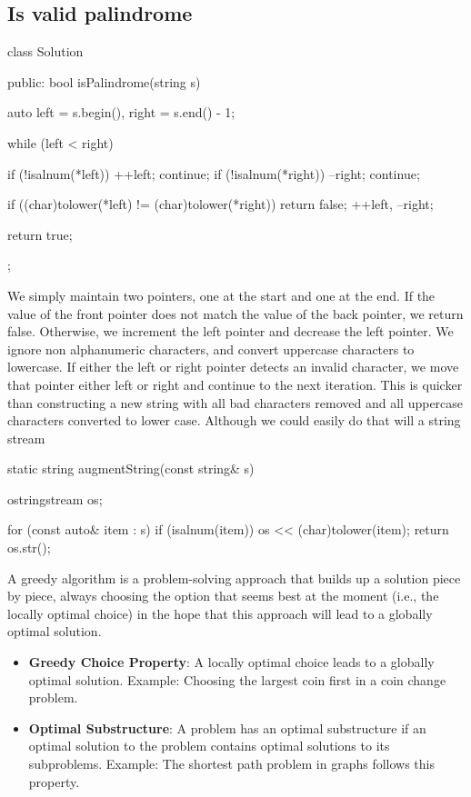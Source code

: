 \documentclass{report}
\begin{document}
\pagebreak 
\subsection{Is valid palindrome}
\bigbreak \noindent 
\begin{cppcode}
    class Solution {
        public:
        bool isPalindrome(string s) {
            auto left = s.begin(), right = s.end() - 1;

            while (left < right) {
                if (!isalnum(*left)) { ++left; continue; }
                if (!isalnum(*right)) { --right; continue; }

                if ((char)tolower(*left) != (char)tolower(*right)) return false;
                ++left, --right;
            }
            return true;
        }
    };
\end{cppcode}
\bigbreak \noindent 
We simply maintain two pointers, one at the start and one at the end. If the value of the front pointer does not match the value of the back pointer, we return false. Otherwise, we increment the left pointer and decrease the left pointer.
\bigbreak \noindent 
We ignore non alphanumeric characters, and convert uppercase characters to lowercase. If either the left or right pointer detects an invalid character, we move that pointer either left or right and continue to the next iteration. This is quicker than constructing a new string with all bad characters removed and all uppercase characters converted to lower case. Although we could easily do that will a string stream
\bigbreak \noindent 
\begin{cppcode}
    static string augmentString(const string& s) {
        ostringstream os;

        for (const auto& item : s) {
            if (isalnum(item)) os << (char)tolower(item);
        }
        return os.str();
    }
\end{cppcode}


\pagebreak 
{}
\bigbreak \noindent 
A greedy algorithm is a problem-solving approach that builds up a solution piece by piece, always choosing the option that seems best at the moment (i.e., the locally optimal choice) in the hope that this approach will lead to a globally optimal solution.
\begin{itemize}
    \item \textbf{Greedy Choice Property}: A locally optimal choice leads to a globally optimal solution.
        \bigbreak \noindent 
        Example: Choosing the largest coin first in a coin change problem.
    \item \textbf{Optimal Substructure}: A problem has an optimal substructure if an optimal solution to the problem contains optimal solutions to its subproblems.
        \bigbreak \noindent 
        Example: The shortest path problem in graphs follows this property.

\end{itemize}
\end{document}
